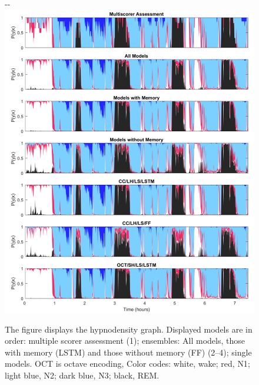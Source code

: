 \begin{figure}[p]
\begin{adjustwidth*}{}{-\marginparsep-\marginparwidth}
    \includegraphics[width=\linewidth]{figures/paper-iii/Figure_2a}
    \caption[Hypnodensity example evaluated by different models]{The figure displays the hypnodensity graph. Displayed models are in order: multiple scorer assessment (1); ensembles: All models, those with memory (\ac{LSTM}) and those without memory (FF) (2–4); single models. OCT is octave encoding, Color codes: white, wake; red, \ac{N1}; light blue, \ac{N2}; dark blue, \ac{N3}; black, \ac{REM}.}
    \label{fig:sleep-stages:paper-iii:figure-02a}
\end{adjustwidth*}
\end{figure}

